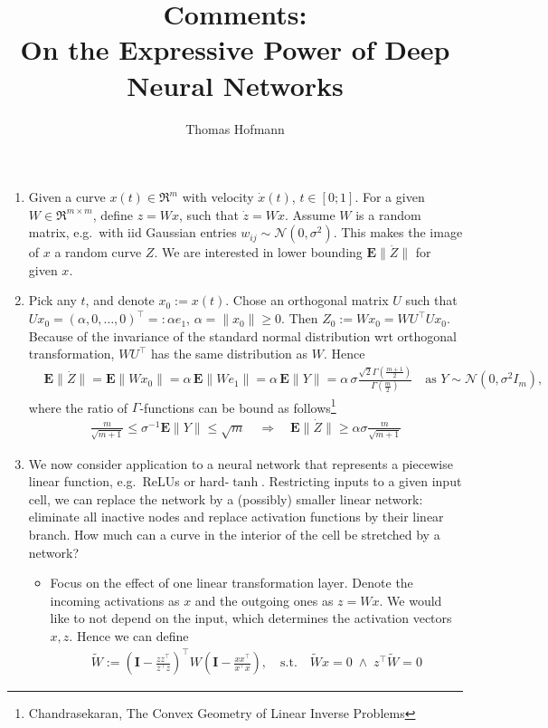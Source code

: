 \documentclass{article}
\author{Thomas Hofmann}
\title{\large{Comments:}\\[3mm] On the Expressive Power of Deep Neural Networks }
\newcommand{\E}{{\mathbf E}}
\newcommand{\mI}{{\mathbf I}}
\begin{document}
\maketitle 
\begin{enumerate}
\item Given a curve $x(t) \in \Re^m$ with velocity $\dot x(t)$, $t \in [0;1]$. For a given $W \in \Re^{m \times m}$, define $z= Wx$, such that $\dot z = W\dot x$. Assume $W$ is a random matrix, e.g.~with iid Gaussian entries $w_{ij} \sim \mathcal N(0,\sigma^2)$. This makes the image of $x$ a random curve $Z$. We are interested in lower bounding $\E\| \dot Z\|$ for given $x$. 
\item Pick any $t$, and denote $x_0 := x(t)$. Chose an orthogonal matrix $U$ such that $U x_0 = (\alpha,0,\dots,0)^\top =: \alpha e_1$, $\alpha = \| x_0\| \ge 0$. Then $Z_0 := Wx_0 = WU^\top U x_0$. Because of the invariance of the standard normal distribution wrt orthogonal transformation, $WU^\top$ has the same distribution as $W$. Hence
\begin{align}
& \E\| \dot Z\| = \E \| Wx_0\| = \alpha \, \E \|W e_1\| = \alpha \,\E\|Y\| = \alpha \, \sigma \frac{\sqrt 2 \Gamma(\tfrac{m+1}{2})}{\Gamma(\tfrac{m}{2})} 
\quad 
\text{as $Y \sim \mathcal N(0,\sigma^2 I_m)$},
\end{align}
where the ratio of $\Gamma$-functions can be bound as follows\footnote{Chandrasekaran, The Convex Geometry of Linear Inverse Problems
}
\begin{align}
\frac{m}{\sqrt{m+1}} \le \sigma^{-1} \E\|Y\| \le  \sqrt m \quad \Longrightarrow \quad 
\E\|\dot Z\| \ge \alpha \sigma \frac{m}{\sqrt{m+1}}
\end{align}
\item We now consider application to a neural network that represents a piecewise linear function, e.g.~ReLUs or hard-$\tanh$.  Restricting inputs to a given input cell, we can replace the network by a (possibly) smaller linear network: eliminate all inactive nodes and replace activation functions by their linear branch. How much can a curve in the interior of the cell be stretched by a network? 
\begin{itemize}
\item Focus on the effect of one linear transformation layer. Denote the incoming activations as $x$ and the outgoing ones as $z=Wx$. We would like to not depend on the input, which determines the activation vectors $x, z$. Hence we can define
\begin{align}
\tilde W := \left(\mI - \frac{z z^\top}{z^\top z} \right)^\top  W  \left(\mI - \frac{xx^\top}{x^\top x} \right), \quad \text{s.t.} \quad \tilde Wx = 0 \; \wedge \; z^\top \tilde W=0

\end{align}
\end{itemize}
\end{enumerate}
\end{document}
